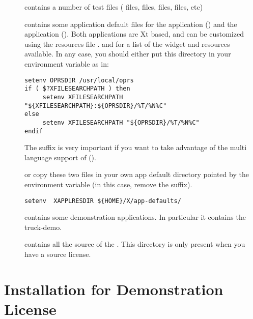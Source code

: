 \begin{description}
\item [] contains a number of test files (
files,  files,  files,  files, etc)

\item [] contains some application default files for the
\XPK{} application () and the \OPE{} application
(). Both applications are Xt based, and can be customized
using the resources file \cite{Xt-manual,Xlib-manual,Motif-manual}.  and  for a list of the widget and resources available.
In any case, you should either put this directory in your
 environment variable as in:

\begin{verbatim}
setenv OPRSDIR /usr/local/oprs
if ( $?XFILESEARCHPATH ) then
     setenv XFILESEARCHPATH "${XFILESEARCHPATH}:${OPRSDIR}/%T/%N%C"
else
     setenv XFILESEARCHPATH "${OPRSDIR}/%T/%N%C"
endif
\end{verbatim}

The  suffix is very important if you want to take advantage of the
multi language support of \COPRS{} ().

or copy these two files in your own app default directory pointed by the
environment variable  (in this case, remove the 
suffix).

\begin{verbatim}
setenv  XAPPLRESDIR ${HOME}/X/app-defaults/
\end{verbatim}

\item [] contains some demonstration applications. In
particular it contains the truck-demo.

\item [] contains all the source of the \COPRSDE{}. This directory is
only present when you have a source license.

\end{description}

\section{Installation for Demonstration License}

